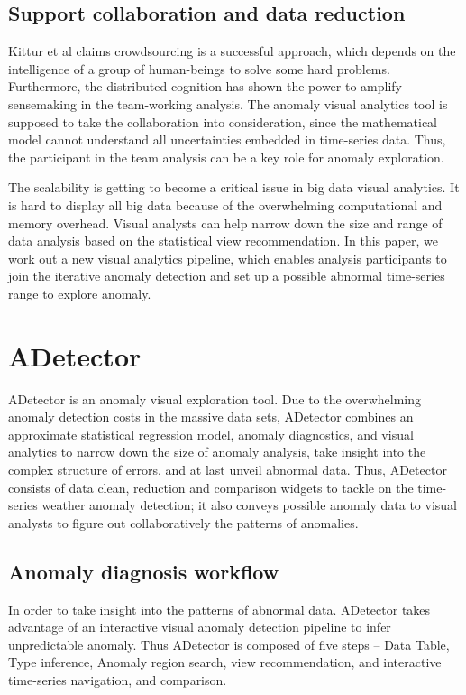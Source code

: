 \documentclass{vgtc}                          %
\begin{document}
\subsection{Support collaboration and data reduction}

Kittur et al\cite{kittur2008crowdsourcing} claims crowdsourcing is a successful approach, which depends on the intelligence of a group of human-beings to solve some hard problems. Furthermore, the distributed cognition\cite{liu2008distributed} has shown the power to amplify sensemaking in the team-working analysis. The anomaly visual analytics tool is supposed to take the collaboration into consideration, since the mathematical model cannot understand all uncertainties embedded in time-series data. Thus, the participant in the team analysis can be a key role for anomaly exploration.
	 
The scalability is getting to become a critical issue in big data visual analytics. It is hard to display all big data because of the overwhelming computational and memory overhead. Visual analysts can help narrow down the size and range of data analysis based on the statistical view recommendation. In this paper, we work out a new visual analytics pipeline, which enables analysis participants to join the iterative anomaly detection and set up a possible abnormal time-series range to explore anomaly.


\section{ADetector}

ADetector is an anomaly visual exploration tool. Due to the overwhelming anomaly detection costs in the massive data sets, ADetector combines an approximate statistical regression model, anomaly diagnostics, and visual analytics to narrow down the size of anomaly analysis, take insight into the complex structure of errors, and at last unveil abnormal data. Thus, ADetector consists of data clean, reduction and comparison widgets to tackle on the time-series weather anomaly detection; it also conveys possible anomaly data to visual analysts to figure out  collaboratively the patterns of anomalies.

\subsection{Anomaly diagnosis workflow}

In order to take insight into the patterns of abnormal data. ADetector takes advantage of an interactive visual anomaly detection pipeline to infer unpredictable anomaly. Thus ADetector is composed of five steps -- Data Table, Type inference, Anomaly region search, view recommendation, and interactive time-series navigation, and comparison.
\end{document}
